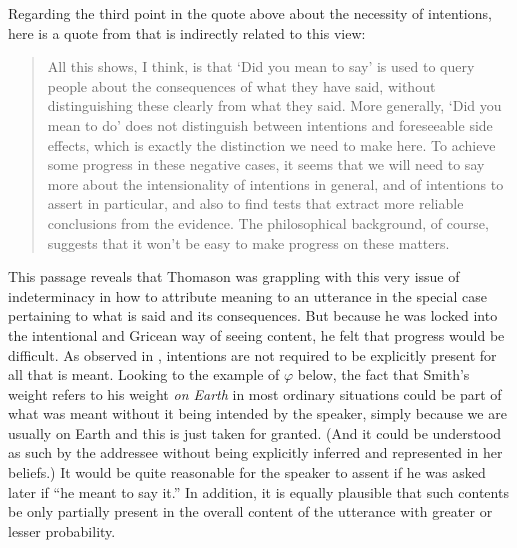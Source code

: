 

Regarding the third point in the quote above about the necessity of intentions, here is a quote from \citet[349]{thomason:ami} that is indirectly related to this view:

\begin{quote}

All this shows, I think, is that `Did you mean to say' is used to query people about the consequences of what they have said, without distinguishing these clearly from what they said. More generally, `Did you mean to do' does not distinguish between intentions and foreseeable side effects, which is exactly the distinction we need to make here. To achieve some progress in these negative cases, it seems that we will need to say more about the intensionality of intentions in general, and of intentions to assert in particular, and also to find tests that extract more reliable conclusions from the evidence. The philosophical background, of course, suggests that it won't be easy to make progress on these matters.

\end{quote}

This passage reveals that Thomason was grappling with this very issue of indeterminacy  in how to attribute meaning to an utterance in the special case pertaining to what is said and its consequences. But because he was locked into the intentional and Gricean way of seeing content, he felt that progress would be difficult. As observed in , intentions are not required to be explicitly present for all that is meant. Looking to the example of $\varphi$ below, the fact that Smith's weight refers to his weight \emph{on Earth} in most ordinary situations could be part of what was meant without it being intended by the speaker, simply because we are usually on Earth and this is just taken for granted. (And it could be understood as such by the addressee without being explicitly inferred and represented in her beliefs.) It would be quite reasonable for the speaker to assent if he was asked later if ``he meant to say it.'' In addition, it is equally plausible that such contents be only partially present in the overall content of the utterance with greater or lesser probability. 

